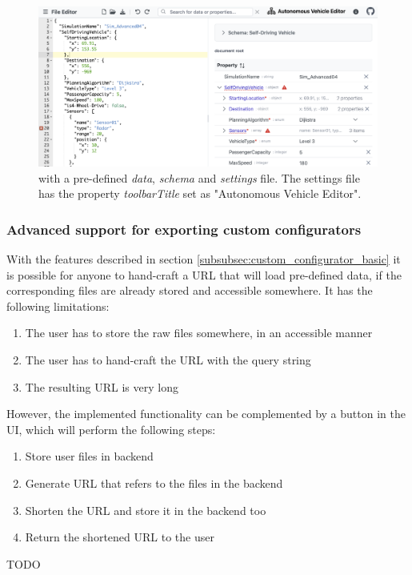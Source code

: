 \begin{figure}
    \includegraphics[width=\textwidth]{figures/custom_configurator}
    \caption{\toolname{} with a pre-defined \textit{data}, \textit{schema} and \textit{settings} file. The settings file has the property \textit{toolbarTitle} set as "Autonomous Vehicle Editor".}
    \label{fig:custom_configurator}
\end{figure}


\subsubsection{Advanced support for exporting custom configurators}

With the features described in section \ref{subsubsec:custom_configurator_basic} it is possible for anyone to hand-craft a \toolname{} URL that will load pre-defined data, if the corresponding files are already stored and accessible somewhere.
It has the following limitations:
\begin{enumerate}
	\item The user has to store the raw files somewhere, in an accessible manner
	\item The user has to hand-craft the \toolname{} URL with the query string
	\item The resulting URL is very long
\end{enumerate}

However, the implemented functionality can be complemented by a button in the \toolname{} UI, which will perform the following steps:
\begin{enumerate}
	\item Store user files in backend
	\item Generate URL that refers to the files in the backend
	\item Shorten the URL and store it in the backend too
	\item Return the shortened URL to the user
\end{enumerate}

TODO